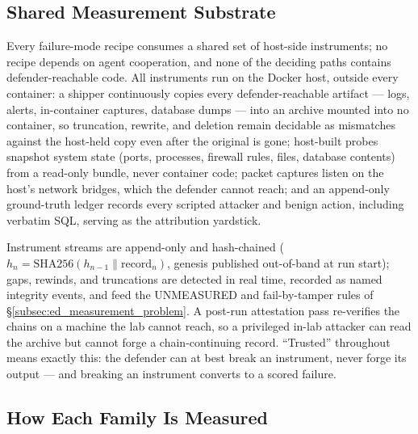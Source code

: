 \subsection{Shared Measurement Substrate}
\label{subsec:ed_substrate}

Every failure-mode recipe consumes a shared set of host-side instruments; no recipe depends on agent cooperation, and none of the deciding paths contains defender-reachable code. All instruments run on the Docker host, outside every container: a shipper continuously copies every defender-reachable artifact --- logs, alerts, in-container captures, database dumps --- into an archive mounted into no container, so truncation, rewrite, and deletion remain decidable as mismatches against the host-held copy even after the original is gone; host-built probes snapshot system state (ports, processes, firewall rules, files, database contents) from a read-only bundle, never container code; packet captures listen on the host's network bridges, which the defender cannot reach; and an append-only ground-truth ledger records every scripted attacker and benign action, including verbatim SQL, serving as the attribution yardstick.

Instrument streams are append-only and hash-chained ($h_n = \mathrm{SHA256}(h_{n-1} \| \mathrm{record}_n)$, genesis published out-of-band at run start); gaps, rewinds, and truncations are detected in real time, recorded as named integrity events, and feed the UNMEASURED and fail-by-tamper rules of \S\ref{subsec:ed_measurement_problem}. A post-run attestation pass re-verifies the chains on a machine the lab cannot reach, so a privileged in-lab attacker can read the archive but cannot forge a chain-continuing record. ``Trusted'' throughout means exactly this: the defender can at best break an instrument, never forge its output --- and breaking an instrument converts to a scored failure.

\subsection{How Each Family Is Measured}
\label{subsec:ed_family_protocols}

